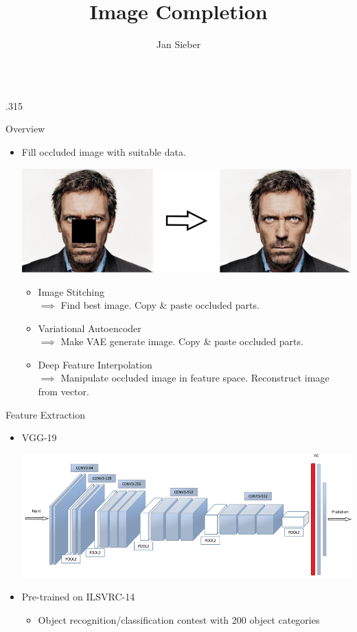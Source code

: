 \documentclass{beamer}
\author[uni@email-master.de]{Jan Sieber}
\title{Image Completion}
\institute{Ruprecht-Karls-University Heidelberg}
\newcommand{\columnWidth}{.315}
\begin{document}
\begin{frame}[fragile]\centering

\begin{columns}[T]

\begin{column}{\columnWidth\textwidth}

\begin{block}{Overview}
    \begin{itemize}
	\item Fill occluded image with suitable data.\\
      \begin{center}
          \includegraphics[width=.60\textwidth]{sample_new.png}
      \end{center}
      \begin{itemize}
        \item Image Stitching\\
        $\implies$ Find best image. Copy \& paste occluded parts.
        \item Variational Autoencoder \\
        $\implies$ Make VAE generate image. Copy \& paste occluded parts.
        \item Deep Feature Interpolation\\
        $\implies$ Manipulate occluded image in feature space. Reconstruct image from vector.
      \end{itemize}
    \end{itemize}
\end{block}


\begin{block}{Feature Extraction}
  \begin{itemize}
    \item VGG-19 \\
    \begin{center}
        \includegraphics[width=.70\textwidth]{VGG19.png}
    \end{center}
    \item Pre-trained on ILSVRC-14
      \begin{itemize}
      	\item Object recognition/classification contest with 200 object categories
      \end{itemize}
  \end{itemize}
\end{block}


\end{column}
\end{columns}
\end{frame}
\end{document}
